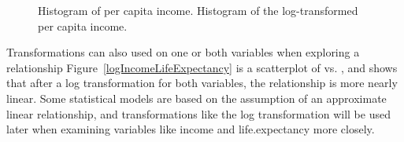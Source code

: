 \begin{doublespace}
\begin{figure}[ht]
\centering
{}
\caption{ Histogram of per capita income.  Histogram of the log-transformed per capita income.}
\label{incomeHistTransform}
\end{figure}






Transformations can also used on one or both variables when exploring a relationship Figure~\ref{logIncomeLifeExpectancy} is a scatterplot of  vs. , and shows that after a log transformation for both variables, the relationship is more nearly linear.  Some statistical models are based on the assumption of an approximate linear relationship, and transformations like the log transformation will be used later when examining variables like income and life.expectancy more closely.



\end{doublespace}
